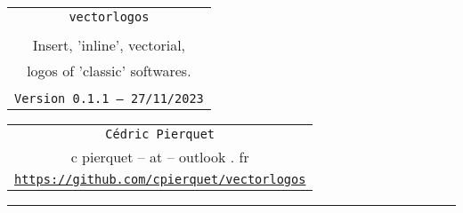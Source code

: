 \documentclass[11pt,a4paper]{ltxdoc}
\def\TPversion{0.1.1}
\def\TPdate{27/11/2023}
\begin{document}
\pagestyle{fancy}

\thispagestyle{empty}

\begin{center}
	\begin{minipage}{0.88\linewidth}
	\begin{tcolorbox}[colframe=yellow,colback=yellow!15]
		\begin{center}
			\begin{tabular}{c}
				{\Huge \texttt{vectorlogos}}\\
				\\
				{\LARGE Insert, 'inline', vectorial,} \\
				{\LARGE logos of 'classic' softwares.} \\
				\\
				{\small \texttt{Version \TPversion{} -- \TPdate}}
		\end{tabular}
		\end{center}
	\end{tcolorbox}
\end{minipage}
\end{center}

\begin{center}
	\begin{tabular}{c}
	\texttt{Cédric Pierquet}\\
	{\ttfamily c pierquet -- at -- outlook . fr}\\
	\texttt{\url{https://github.com/cpierquet/vectorlogos}} \\
\end{tabular}
\end{center}

\hrule

\vfill
\end{document}
